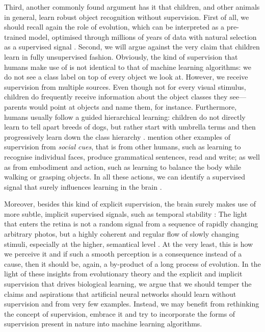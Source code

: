 {Third, another commonly found argument has it that children, and other animals in general, learn robust object recognition without supervision. First of all, we should recall again the role of evolution, which can be interpreted as a pre-trained model, optimised through millions of years of data with natural selection as a supervised signal \citep{zador2019purelearning}. Second, we will argue against the very claim that children learn in fully unsupervised fashion. Obviously, the kind of supervision that humans make use of is not identical to that of machine learning algorithms: we do not see a class label on top of every object we look at. However, we receive supervision from multiple sources. Even though not for every visual stimulus, children do frequently receive information about the object classes they see---parents would point at objects and name them, for instance. Furthermore, humans usually follow a guided hierarchical learning: children do not directly learn to tell apart breeds of dogs, but rather start with umbrella terms and then progressively learn down the class hierarchy \citep{bornstein2010hierarchychildren}. \citet{hasson2020directfit} mention other examples of supervision from \textit{social cues}, that is from other humans, such as learning to recognise individual faces, produce grammatical sentences, read and write; as well as from embodiment and action, such as learning to balance the body while walking or grasping objects. In all these actions, we can identify a supervised signal that surely influences learning in the brain \citep{shapiro2019embodied}.

Moreover, besides this kind of explicit supervision, the brain surely makes use of more subtle, implicit supervised signals, such as temporal stability \citep{becker1999temporalstability, wyss2003temporalstability}: The light that enters the retina is not a random signal from a sequence of rapidly changing arbitrary photos, but a highly coherent and regular flow of slowly changing stimuli, especially at the higher, semantical level \citep{kording2004complexcells}. At the very least, this is how we perceive it and if such a smooth perception is a consequence instead of a cause, then it should be, again, a by-product of a long process of evolution. In the light of these insights from evolutionary theory and the explicit and implicit supervision that drives biological learning, we argue that we should temper the claims and aspirations that artificial neural networks should learn without supervision and from very few examples. Instead, we may benefit from rethinking the concept of supervision, embrace it and try to incorporate the forms of supervision present in nature into machine learning algorithms.

}
